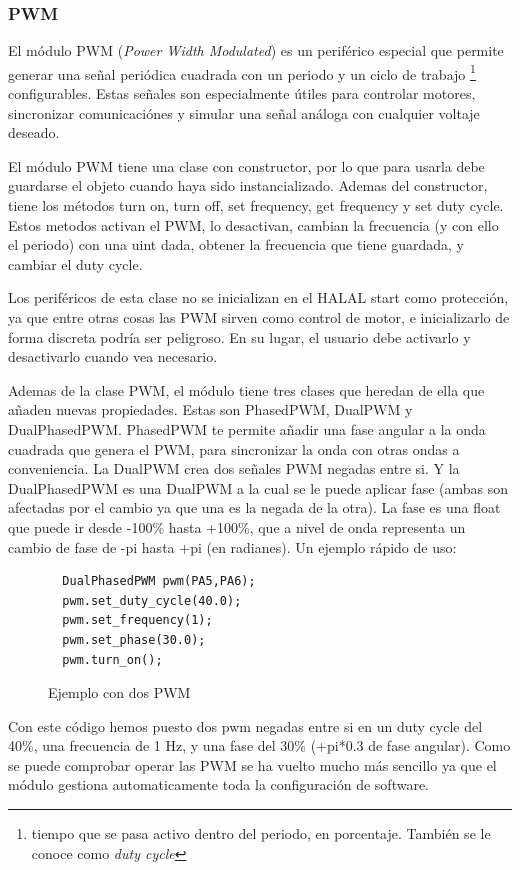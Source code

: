 \documentclass{report}
\begin{document}
\subsubsection{PWM}
El módulo PWM (\textit{Power Width Modulated}) es un periférico especial que permite generar una señal periódica cuadrada con un periodo y un ciclo de trabajo \footnote{tiempo que se pasa activo dentro del periodo, en porcentaje. También se le conoce como \textit{duty cycle}} configurables. Estas señales son especialmente útiles para controlar motores, sincronizar comunicaciónes y simular una señal análoga con cualquier voltaje deseado. 
\par \vspace{0.3cm}
El módulo PWM tiene una clase con constructor, por lo que para usarla debe guardarse el objeto cuando haya sido instancializado. Ademas del constructor, tiene los métodos turn on, turn off, set frequency, get frequency y set duty cycle. Estos metodos activan el PWM, lo desactivan, cambian la frecuencia (y con ello el periodo) con una uint dada, obtener la frecuencia que tiene guardada, y cambiar el duty cycle. \par
Los periféricos de esta clase no se inicializan en el HALAL start como protección, ya que entre otras cosas las PWM sirven como control de motor, e inicializarlo de forma discreta podría ser peligroso. En su lugar, el usuario debe activarlo y desactivarlo cuando vea necesario. 
\par \vspace{0.3cm}
Ademas de la clase PWM, el módulo tiene tres clases que heredan de ella que añaden nuevas propiedades. Estas son PhasedPWM, DualPWM y DualPhasedPWM. PhasedPWM te permite añadir una fase angular a la onda cuadrada que genera el PWM, para sincronizar la onda con otras ondas a conveniencia. La DualPWM crea dos señales PWM negadas entre si. Y la DualPhasedPWM es una DualPWM a la cual se le puede aplicar fase (ambas son afectadas por el cambio ya que una es la negada de la otra). La fase es una float que puede ir desde -100\% hasta +100\%, que a nivel de onda representa un cambio de fase de -pi hasta +pi (en radianes). Un ejemplo rápido de uso:
\begin{figure}[h]
\begin{lstlisting}
  DualPhasedPWM pwm(PA5,PA6);
  pwm.set_duty_cycle(40.0);
  pwm.set_frequency(1);
  pwm.set_phase(30.0);
  pwm.turn_on();
\end{lstlisting}
\caption{Ejemplo con dos PWM}
  \label{PWMcode}
\end{figure}
\par \vspace{0.3 cm}
Con este código hemos puesto dos pwm negadas entre si en un duty cycle del 40\%, una frecuencia de 1 Hz, y una fase del 30\% (+pi*0.3 de fase angular). Como se puede comprobar operar las PWM se ha vuelto mucho más sencillo ya que el módulo gestiona automaticamente toda la configuración de software.  
\end{document}
